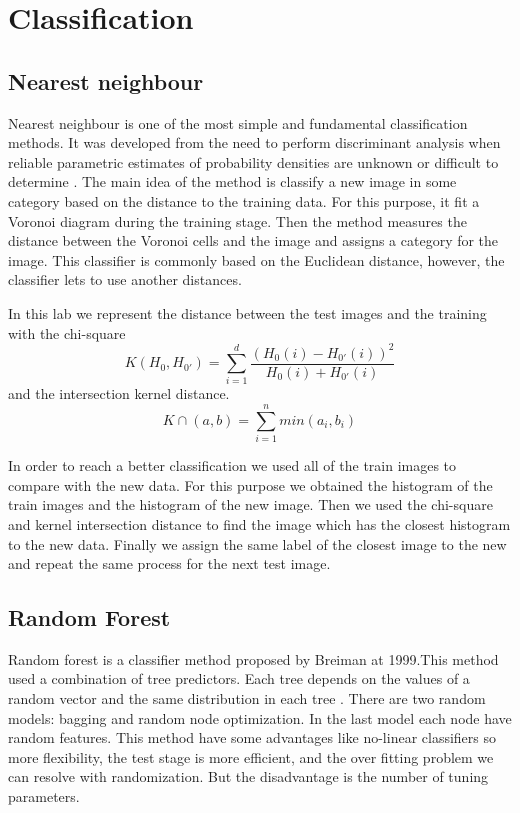 \documentclass[10pt,twocolumn,letterpaper]{article}
\begin{document}
\section{Classification}


\subsection{Nearest neighbour}

Nearest neighbour is one of the most simple and fundamental classification methods. It was developed from the need to perform discriminant analysis when reliable parametric estimates of probability densities are unknown or difficult to determine\cite{2} . The main idea of the method is classify a new image in some category based on the distance to the training data. For this purpose, it fit a Voronoi diagram during the training stage. Then the method measures the distance between the Voronoi cells and the image and assigns a category for the image. This classifier is commonly based on the Euclidean distance, however, the classifier lets to use another distances. 

In this lab we represent the distance between the test images and the training with the chi-square 
\begin{equation}
K\left ( H_{0}, H_{0'}\right )= \sum_{i=1}^{d}\frac{\left ( H_{0}\left ( i \right )- H_{0'}\left ( i \right )\right )^{2}}{ H_{0}\left ( i \right )+ H_{0'}\left ( i \right )}
\end{equation}
and the intersection kernel distance.
\begin{equation}
K\cap \left ( a,b \right )= \sum_{i=1}^{n} min\left ( a_{i}, b_{i} \right )
\end{equation}

In order to reach a better classification we used all of the train images to compare with the new data. For this purpose we obtained the histogram of the train images and the histogram of the new image. Then we used the chi-square and kernel intersection distance to find the image which has the closest histogram to the new data. Finally we assign the same label of the closest image to the new and repeat the same process for the next test image. 


\subsection{Random Forest}

Random forest is a classifier method proposed by Breiman at 1999.This method used a combination of tree predictors. Each tree depends on the values of a random vector and the same distribution in each tree \cite{3}. There are two random models: bagging and random node optimization. In the last model each node have random features. This method have some advantages like no-linear classifiers so more flexibility, the test stage is more efficient, and the over fitting problem we can resolve with randomization. But the disadvantage is the number of tuning parameters. \cite{4}
\end{document}
